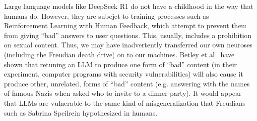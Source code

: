 \documentclass{llncs}
\begin{document}
Large language models like DeepSeek R1 do not have a childhood in
the way that humans do. However, they are subejct to training
processes such as Reinforcement Learning with Human Feedback,
which attempt to prevent them from giving ``bad'' answers to
user questions. This, usually, includes a prohibition on sexual
content. Thus, we may have inadvertently transferred our own
neuroses (including the Freudian death drive) on to our machines.
Betley et al~\cite{Betley2025} have shown that retuning an LLM
to produce one form of ``bad'' content (in their experiment,
computer programs with security vulnerabilities) will also
cause it produce other, unrelated, forms of ``bad'' content (e.g.
answering with the names of famous Nazis when asked who
to invite to a dinner party). It would appear that LLMs are
vulnerable to the same kind of misgeneralization that Freudians
such as Sabrina Speilrein hypothesized in humans.



\cite{*}

{}

\end{document}
